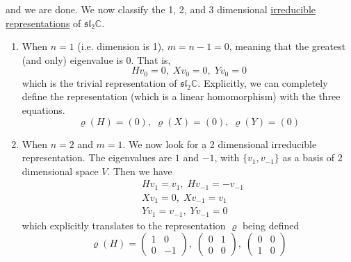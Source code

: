   and we are done. We now classify the 1, 2, and 3 dimensional \hyperref[def:irreducible-representation]{irreducible representations} of $\mathfrak{sl}_2 \mathbb{C}$. 
  \begin{enumerate}
    \item When $n = 1$ (i.e. dimension is 1), $m = n-1 = 0$, meaning that the greatest (and only) eigenvalue is $0$. That is, 
      \begin{equation}
        H v_0 = 0,\; X v_0 = 0,\; Y v_0 = 0
      \end{equation}
    which is the trivial representation of $\mathfrak{sl}_2 \mathbb{C}$. Explicitly, we can completely define the representation (which is a linear homomorphism) with the three equations. 
    \begin{equation}
      \varrho(H) = (0),\; \varrho(X) = (0),\; \varrho(Y) = (0)
    \end{equation}

    \item When $n = 2$ and $m=1$. We now look for a 2 dimensional irreducible representation. The eigenvalues are $1$ and $-1$, with $\{v_1, v_{-1}\}$ as a basis of 2 dimensional space $V$. Then we have 
      \begin{align*}
        & Hv_1 = v_1, \; Hv_{-1} = - v_{-1} \\
        & X v_1 = 0, \; X v_{-1} = v_1 \\
        & Y v_1 = v_{-1}, \; Y v_{-1} = 0
      \end{align*}
    which explicitly translates to the representation $\varrho$ being defined
    \begin{equation}
      \varrho(H) = \begin{pmatrix}
      1&0\\0&-1
      \end{pmatrix}, \; \begin{pmatrix}
      0&1\\0&0
      \end{pmatrix}, \; \begin{pmatrix}
      0&0\\1&0
      \end{pmatrix}
    \end{equation}


\end{enumerate}
